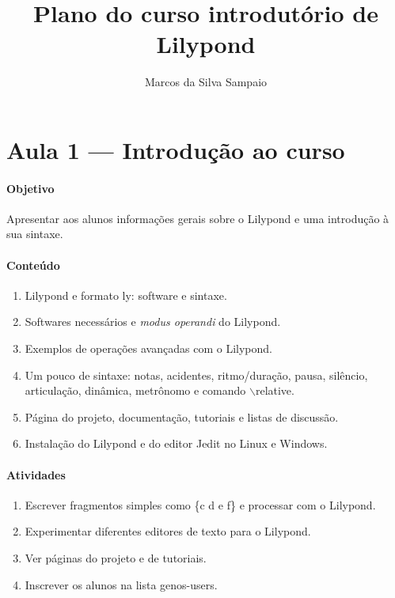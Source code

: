 \documentclass[12pt,brazil]{article}
\newcommand{\eng}[1]{\textit{#1}}
\begin{document}
\title{Plano do curso introdutório de Lilypond}
\author{Marcos da Silva Sampaio}
\maketitle
\thispagestyle{empty}

\section{Aula 1 --- Introdução ao curso}

\paragraph{Objetivo}
Apresentar aos alunos informações gerais sobre o Lilypond e uma
introdução à sua sintaxe.

\paragraph{Conteúdo}
\begin{enumerate}
\item Lilypond e formato ly: software e sintaxe.
\item Softwares necessários e \eng{modus operandi} do Lilypond.
\item Exemplos de operações avançadas com o Lilypond.
\item Um pouco de sintaxe: notas, acidentes, ritmo/duração, pausa,
  silêncio, articulação, dinâmica, metrônomo e comando
  $\backslash$relative.
\item Página do projeto, documentação, tutoriais e listas de discussão.
\item Instalação do Lilypond e do editor Jedit no Linux e Windows.
\end{enumerate}

\paragraph{Atividades}
\begin{enumerate}
\item Escrever fragmentos simples como \{c d e f\} e processar com o
  Lilypond.
\item Experimentar diferentes editores de texto para o Lilypond.
\item Ver páginas do projeto e de tutoriais.
\item Inscrever os alunos na lista genos-users.
\end{enumerate}
\end{document}
